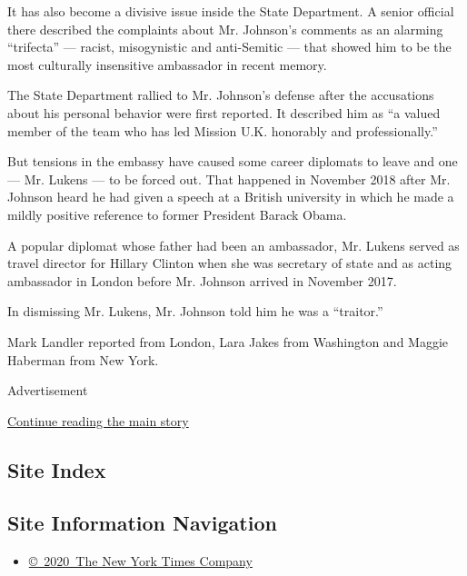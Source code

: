 It has also become a divisive issue inside the State Department. A
senior official there described the complaints about Mr. Johnson's
comments as an alarming ``trifecta'' --- racist, misogynistic and
anti-Semitic --- that showed him to be the most culturally insensitive
ambassador in recent memory.

The State Department rallied to Mr. Johnson's defense after the
accusations about his personal behavior were first reported. It
described him as ``a valued member of the team who has led Mission U.K.
honorably and professionally.''

But tensions in the embassy have caused some career diplomats to leave
and one --- Mr. Lukens --- to be forced out. That happened in November
2018 after Mr. Johnson heard he had given a speech at a British
university in which he made a mildly positive reference to former
President Barack Obama.

A popular diplomat whose father had been an ambassador, Mr. Lukens
served as travel director for Hillary Clinton when she was secretary of
state and as acting ambassador in London before Mr. Johnson arrived in
November 2017.

In dismissing Mr. Lukens, Mr. Johnson told him he was a ``traitor.''

Mark Landler reported from London, Lara Jakes from Washington and Maggie
Haberman from New York.

Advertisement

\protect\hyperlink{after-bottom}{Continue reading the main story}

\hypertarget{site-index}{%
\subsection{Site Index}\label{site-index}}

\hypertarget{site-information-navigation}{%
\subsection{Site Information
Navigation}\label{site-information-navigation}}

\begin{itemize}
\tightlist
\item
  \href{https://help.nytimes3xbfgragh.onion/hc/en-us/articles/115014792127-Copyright-notice}{©~2020~The
  New York Times Company}
\end{itemize}

